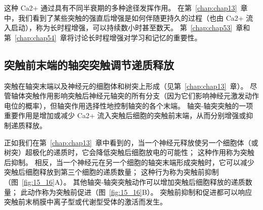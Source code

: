 这种 Ca2+ 通过具有不同半衰期的多种途径发挥作用。 
在第~\ref{chap:chap13}~章中，我们看到了某些突触的强直后增强是如何伴随更持久的过程（也由 Ca2+ 流入启动），称为长时程增强，可以持续数小时甚至数天。
第~\ref{chap:chap53}~章和第~\ref{chap:chap54}~章将讨论长时程增强对学习和记忆的重要性。



\subsection{突触前末端的轴突突触调节递质释放}

突触在轴突末端以及神经元的细胞体和树突上形成（见第~\ref{chap:chap13}~章）。
尽管轴体突触作用影响突触后神经元轴突的所有分支（因为它们影响神经元激发动作电位的概率），但轴突作用选择性地控制轴突的各个末端。
轴突-轴突突触的一项重要作用是增加或减少 Ca2+ 流入突触后细胞的突触前末端，从而分别增强或抑制递质释放。


正如我们在第~\ref{chap:chap13}~章中看到的，当一个神经元释放使另一个细胞体（或树突）超极化的递质时，它会降低突触后细胞放电的可能性；
这种作用称为突触后抑制。
相反，当一个神经元在另一个细胞的轴突末端形成突触时，它可以减少突触后细胞释放到第三个细胞的递质数量；
这种行为称为突触前抑制（图~\ref{fig:15_16}A）。
其他轴突-轴突突触动作可以增加突触后细胞释放的递质数量； 此动作称为突触前促进（图~\ref{fig:15_16}B）。
突触前抑制和促进都可以响应突触前末梢膜中离子型或代谢型受体的激活而发生。



